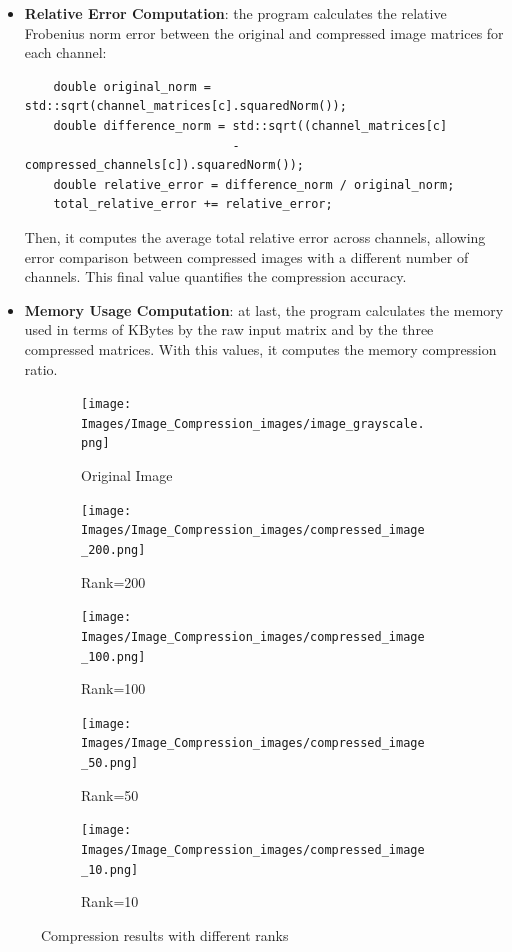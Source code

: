 \documentclass[11pt,a4paper]{article}
\begin{document}
\begin{itemize}
    \item \textbf{Relative Error Computation}: the program calculates the relative Frobenius norm error between the original and compressed image matrices for each channel:
    \begin{verbatim}
    double original_norm = std::sqrt(channel_matrices[c].squaredNorm());
    double difference_norm = std::sqrt((channel_matrices[c] 
                             - compressed_channels[c]).squaredNorm());
    double relative_error = difference_norm / original_norm;
    total_relative_error += relative_error;
    \end{verbatim}
    Then, it computes the average total relative error across channels, allowing error comparison between compressed images with a different number of channels. This final value quantifies the compression accuracy.
    \item \textbf{Memory Usage Computation}: at last, the program calculates the memory used in terms of KBytes by the raw input matrix and by the three compressed matrices. With this values, it computes the memory compression ratio.
\end{itemize}
\begin{figure}[h!]
\centering
\begin{subfigure}{0.3\textwidth}
    \centering
    \texttt{[image: Images/Image\_Compression\_images/image\_grayscale.png]}
    \caption{Original Image \\}
\end{subfigure}
\hspace{0.05cm}
\begin{subfigure}{0.3\textwidth}
    \centering
    \texttt{[image: Images/Image\_Compression\_images/compressed\_image\_200.png]}
    \caption{Rank=200}
\end{subfigure}

\vspace{0.5cm} %

\begin{subfigure}{0.3\textwidth}
    \centering
    \texttt{[image: Images/Image\_Compression\_images/compressed\_image\_100.png]}
    \caption{Rank=100}
\end{subfigure}
\hspace{0.05cm}
\begin{subfigure}{0.3\textwidth}
    \centering
    \texttt{[image: Images/Image\_Compression\_images/compressed\_image\_50.png]}
    \caption{Rank=50}
\end{subfigure}
\hspace{0.05cm}
\begin{subfigure}{0.3\textwidth}
    \centering
    \texttt{[image: Images/Image\_Compression\_images/compressed\_image\_10.png]}
    \caption{Rank=10}
\end{subfigure}

\caption{Compression results with different ranks}
\label{fig:compression_comparison}
\end{figure}
\end{document}

